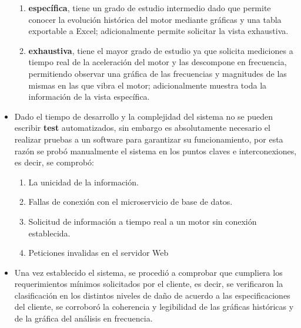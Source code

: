 \begin{itemize}
\begin{enumerate}
            \item \textbf{específica}, tiene un grado de estudio intermedio dado que
                permite conocer la evolución histórica del motor mediante gráficas
                y una tabla exportable a Excel; adicionalmente permite solicitar
                la vista exhaustiva.
            \item \textbf{exhaustiva}, tiene el mayor grado de estudio ya que
                solicita mediciones a tiempo real de la aceleración del motor
                y las descompone en frecuencia, permitiendo observar una gráfica
                de las frecuencias y magnitudes de las mismas en las que vibra
                el motor; adicionalmente muestra toda la información de la
                vista específica.
        \end{enumerate}
    \item Dado el tiempo de desarrollo y la complejidad del sistema no se
        pueden escribir \textbf{test} automatizados, sin embargo es absolutamente
        necesario el realizar pruebas a un software para garantizar su funcionamiento,
        por esta razón se probó manualmente el sistema en los puntos claves
        e interconexiones, es decir, se comprobó:
        \begin{enumerate}
            \item La unicidad de la información.
            \item Fallas de conexión con el microservicio de base de datos.
            \item Solicitud de información a tiempo real a un motor sin conexión
                establecida.
            \item Peticiones invalidas en el servidor Web
        \end{enumerate}
    \item Una vez establecido el sistema, se procedió a comprobar que cumpliera
        los requerimientos mínimos solicitados por el cliente, es decir, se
        verificaron la clasificación en los distintos niveles de daño de acuerdo
        a las especificaciones del cliente, se corroboró la coherencia y legibilidad
        de las gráficas históricas y de la gráfica del análisis en frecuencia.
\end{itemize}



